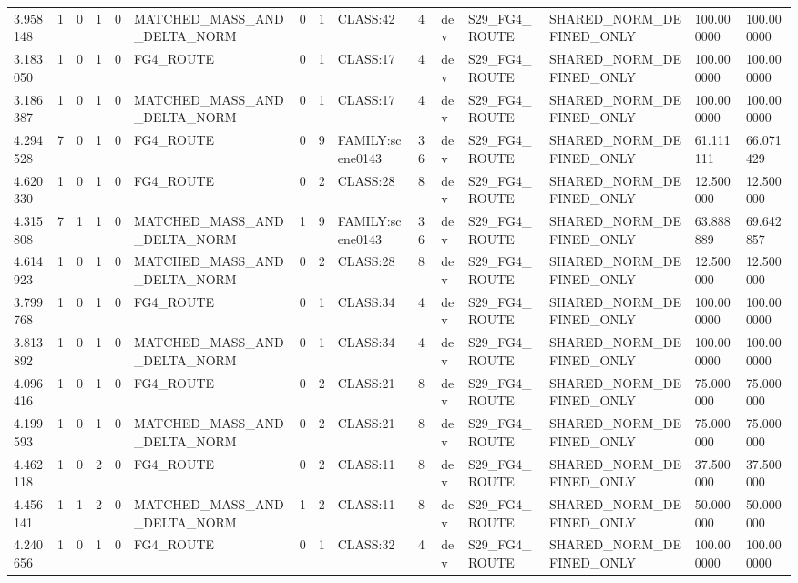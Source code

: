 \begin{tabular}{lllllllllllllll}
3.958148 & 1 & 0 & 1 & 0 & MATCHED\_MASS\_AND\_DELTA\_NORM & 0 & 1 & CLASS:42 & 4 & dev & S29\_FG4\_ROUTE & SHARED\_NORM\_DEFINED\_ONLY & 100.000000 & 100.000000 \\
3.183050 & 1 & 0 & 1 & 0 & FG4\_ROUTE & 0 & 1 & CLASS:17 & 4 & dev & S29\_FG4\_ROUTE & SHARED\_NORM\_DEFINED\_ONLY & 100.000000 & 100.000000 \\
3.186387 & 1 & 0 & 1 & 0 & MATCHED\_MASS\_AND\_DELTA\_NORM & 0 & 1 & CLASS:17 & 4 & dev & S29\_FG4\_ROUTE & SHARED\_NORM\_DEFINED\_ONLY & 100.000000 & 100.000000 \\
4.294528 & 7 & 0 & 1 & 0 & FG4\_ROUTE & 0 & 9 & FAMILY:scene0143 & 36 & dev & S29\_FG4\_ROUTE & SHARED\_NORM\_DEFINED\_ONLY & 61.111111 & 66.071429 \\
4.620330 & 1 & 0 & 1 & 0 & FG4\_ROUTE & 0 & 2 & CLASS:28 & 8 & dev & S29\_FG4\_ROUTE & SHARED\_NORM\_DEFINED\_ONLY & 12.500000 & 12.500000 \\
4.315808 & 7 & 1 & 1 & 0 & MATCHED\_MASS\_AND\_DELTA\_NORM & 1 & 9 & FAMILY:scene0143 & 36 & dev & S29\_FG4\_ROUTE & SHARED\_NORM\_DEFINED\_ONLY & 63.888889 & 69.642857 \\
4.614923 & 1 & 0 & 1 & 0 & MATCHED\_MASS\_AND\_DELTA\_NORM & 0 & 2 & CLASS:28 & 8 & dev & S29\_FG4\_ROUTE & SHARED\_NORM\_DEFINED\_ONLY & 12.500000 & 12.500000 \\
3.799768 & 1 & 0 & 1 & 0 & FG4\_ROUTE & 0 & 1 & CLASS:34 & 4 & dev & S29\_FG4\_ROUTE & SHARED\_NORM\_DEFINED\_ONLY & 100.000000 & 100.000000 \\
3.813892 & 1 & 0 & 1 & 0 & MATCHED\_MASS\_AND\_DELTA\_NORM & 0 & 1 & CLASS:34 & 4 & dev & S29\_FG4\_ROUTE & SHARED\_NORM\_DEFINED\_ONLY & 100.000000 & 100.000000 \\
4.096416 & 1 & 0 & 1 & 0 & FG4\_ROUTE & 0 & 2 & CLASS:21 & 8 & dev & S29\_FG4\_ROUTE & SHARED\_NORM\_DEFINED\_ONLY & 75.000000 & 75.000000 \\
4.199593 & 1 & 0 & 1 & 0 & MATCHED\_MASS\_AND\_DELTA\_NORM & 0 & 2 & CLASS:21 & 8 & dev & S29\_FG4\_ROUTE & SHARED\_NORM\_DEFINED\_ONLY & 75.000000 & 75.000000 \\
4.462118 & 1 & 0 & 2 & 0 & FG4\_ROUTE & 0 & 2 & CLASS:11 & 8 & dev & S29\_FG4\_ROUTE & SHARED\_NORM\_DEFINED\_ONLY & 37.500000 & 37.500000 \\
4.456141 & 1 & 1 & 2 & 0 & MATCHED\_MASS\_AND\_DELTA\_NORM & 1 & 2 & CLASS:11 & 8 & dev & S29\_FG4\_ROUTE & SHARED\_NORM\_DEFINED\_ONLY & 50.000000 & 50.000000 \\
4.240656 & 1 & 0 & 1 & 0 & FG4\_ROUTE & 0 & 1 & CLASS:32 & 4 & dev & S29\_FG4\_ROUTE & SHARED\_NORM\_DEFINED\_ONLY & 100.000000 & 100.000000 \\

\end{tabular}
